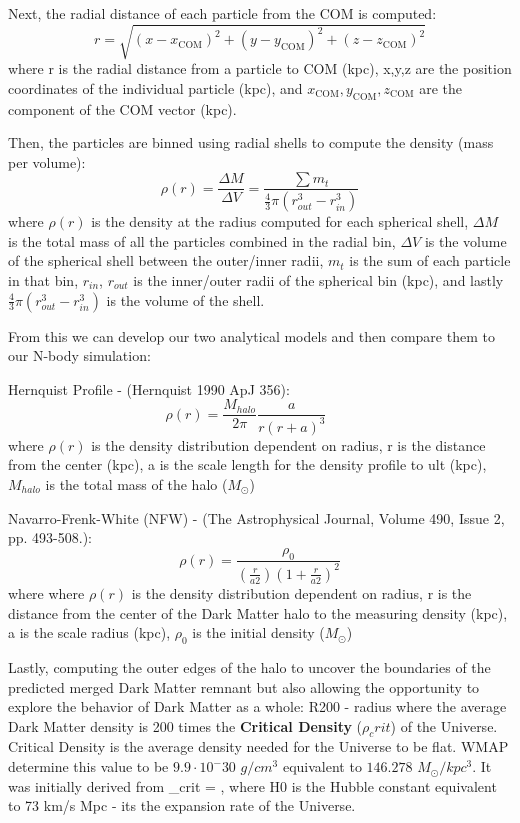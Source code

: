 \documentclass[fleqn,usenatbib]{mnras}
\begin{document}
Next, the radial distance of each particle from the COM is computed:
\begin{equation}
    r = \sqrt{(x-x_{\text{COM}})^2+(y-y_{\text{COM}})^2+(z-z_{\text{COM}})^2}
	\label{eq:radial}
\end{equation}
where r is the radial distance from a particle to COM (kpc), x,y,z are the position coordinates of the individual particle (kpc), and \(x_{\text{COM}}, y_{\text{COM}}, z_{\text{COM}}\) are the component of the COM vector (kpc).

Then, the particles are binned using radial shells to compute the density (mass per volume):
\begin{equation}
    \rho(r) = \frac{\Delta M}{\Delta V}= \frac{\sum m_t}{\frac{4}{3}\pi(r^3_{out}-r^3_{in})}
	\label{eq:bins}
\end{equation}
where \(\rho (r)\) is the density at the radius computed for each spherical shell, \(\Delta M\) is the total mass of all the particles combined in the radial bin, \(\Delta V\) is the volume of the spherical shell between the outer/inner radii, \(m_t\) is the sum of each particle in that bin, \(r_{in}\), \(r_{out}\) is the inner/outer radii of the spherical bin (kpc), and lastly \(\frac 43 \pi (r^3_{out}-r^3_{in})\) is the volume of the shell.

From this we can develop our two analytical models and then compare them to our N-body simulation:

Hernquist Profile - (Hernquist 1990 ApJ 356):
\begin{equation}
    \rho(r) =  \frac{M_{halo}}{2\pi} \frac{a}{r(r+a)^3} \qquad  
	\label{eq:herquist}
\end{equation}
where \(\rho(r)\) is the density distribution dependent on radius, r is the distance from the center (kpc), a is the scale length for the density profile to ult (kpc), \(M_{halo}\) is the total mass of the halo (\(M_\odot\)) 

Navarro-Frenk-White (NFW) - (The Astrophysical Journal, Volume 490, Issue 2, pp. 493-508.):
\begin{equation}
    \rho(r) =  \frac{\rho_0}{\left( \frac{r}{a2} \right)\left( 1 + \frac{r}{a2} \right)^2}  
	\label{eq:NFW}
\end{equation}
where where \(\rho(r)\) is the density distribution dependent on radius, r is the distance from the center of the Dark Matter halo to the measuring density (kpc), a is the scale radius (kpc), \(\rho_{0}\) is the initial density (\(M_\odot\))

Lastly, computing the outer edges of the halo to uncover the boundaries of the predicted merged Dark Matter remnant but also allowing the opportunity to explore the behavior of Dark Matter as a whole:
R200 - radius where the average Dark Matter density is 200 times the \textbf{Critical Density} (\(\rho_crit\)) of the Universe. Critical Density is the average density needed for the Universe to be flat. WMAP determine this value to be \(9.9 \cdot 10^-30\) \(g/cm^3\) equivalent to \(146.278\) \(M_\odot/kpc^3\). It was initially derived from \rho_{crit} = \) ,
where H0 is the Hubble constant equivalent to 73 km/s  Mpc - its the expansion rate of the Universe.
\end{document}
